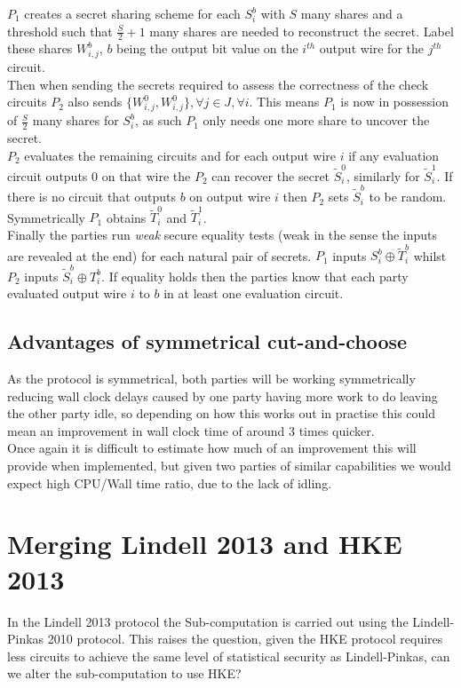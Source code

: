 \documentclass[ %
                    author={Nicholas Tutte},
                supervisor={Prof. Nigel Smart},
                    degree={MEng},
                     title={Secure Two Party Computation},
                  subtitle={A practical comparison of recent protocols},
                      type={Research - GG1K},
                      year={2015} ]{dissertation}
\begin{document}
				$P_1$ creates a secret sharing scheme for each $S_i^b$ with $S$ many shares and a threshold such that $\frac{S}{2} + 1$ many shares are needed to reconstruct the secret. Label these shares $W_{i, j}^b$, $b$ being the output bit value on the $i^{th}$ output wire for the $j^{th}$ circuit.\\

				Then when sending the secrets required to assess the correctness of the check circuits $P_2$ also sends $\{W_{i, j}^0, W_{i, j}^0\}, \forall j \in J, \forall i$. This means $P_1$ is now in possession of $\frac{S}{2}$ many shares for $S_i^b$, as such $P_1$ only needs one more share to uncover the secret.\\

				$P_2$ evaluates the remaining circuits and for each output wire $i$ if any evaluation circuit outputs $0$ on that wire the $P_2$ can recover the secret $\tilde S_i^0$, similarly for $\tilde S_i^1$. If there is no circuit that outputs $b$ on output wire $i$ then $P_2$ sets $\tilde S_i^b$ to be random. Symmetrically $P_1$ obtains $\tilde T_i^0$ and $\tilde T_i^1$.\\

				Finally the parties run \emph{weak} secure equality tests (weak in the sense the inputs are revealed at the end) for each natural pair of secrets. $P_1$ inputs $S_i^b \oplus \tilde T_i^b$ whilst $P_2$ inputs $\tilde S_i^b \oplus T_i^b$. If equality holds then the parties know that each party evaluated output wire $i$ to $b$ in at least one evaluation circuit.\\

				

			\subsection{Advantages of symmetrical cut-and-choose}
				As the protocol is symmetrical, both parties will be working symmetrically reducing wall clock delays caused by one party having more work to do leaving the other party idle, so depending on how this works out in practise this could mean an improvement in wall clock time of around $3$ times quicker.\\

				Once again it is difficult to estimate how much of an improvement this will provide when implemented, but given two parties of similar capabilities we would expect high CPU/Wall time ratio, due to the lack of idling.


		\section{Merging Lindell 2013 and HKE 2013}
			In the Lindell 2013 protocol the Sub-computation is carried out using the Lindell-Pinkas 2010 protocol. This raises the question, given the HKE protocol requires less circuits to achieve the same level of statistical security as Lindell-Pinkas, can we alter the sub-computation to use HKE?\\
\end{document}
